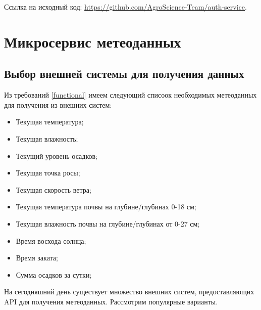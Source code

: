     Ссылка на исходный код: \url{https://github.com/AgroScience-Team/auth-service}.


    \section{Микросервис метеоданных}
    \subsection{Выбор внешней системы для получения данных}

     Из требований \ref{functional} имеем следующий списоок необходимых метеоданных для получения из внешних систем:

    \begin{itemize}
        \item Текущая температура;
        \item Текущая влажность;
        \item Текущий уровень осадков;
        \item Текущая точка росы;
        \item Текущая скорость ветра;
        \item Текущая температура почвы на глубине/глубинах 0-18 см;
        \item Текущая влажность почвы на глубине/глубинах от 0-27 см;
        \item Время восхода солнца;
        \item Время заката;
        \item Сумма осадков за сутки;
    \end{itemize}

    На сегодняшний день существует множество внешних систем, предоставляющих API для получения метеоданных. Рассмотрим популярные варианты.

